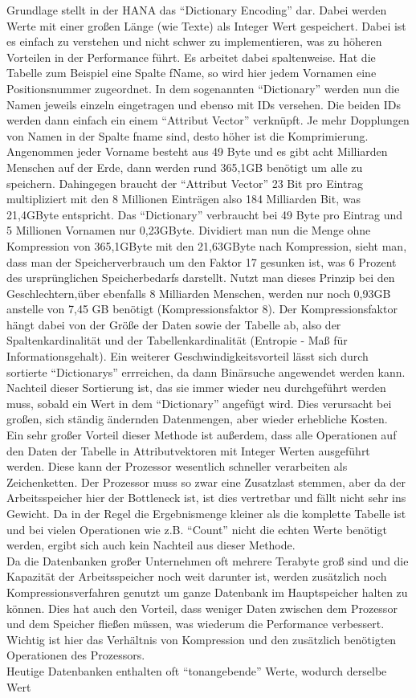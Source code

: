 \documentclass[a4paper, 12pt]{scrartcl}
\begin{document}
Grundlage stellt in der HANA das "`Dictionary Encoding"' dar. Dabei werden Werte mit einer großen Länge (wie Texte) als Integer Wert gespeichert. Dabei ist es einfach zu verstehen und nicht schwer zu implementieren, was zu höheren Vorteilen in der Performance führt. Es arbeitet dabei spaltenweise. Hat die Tabelle zum Beispiel eine Spalte fName, so wird hier jedem Vornamen eine Positionsnummer zugeordnet. In dem sogenannten "`Dictionary"' werden nun die Namen jeweils einzeln eingetragen und ebenso mit IDs versehen. Die beiden IDs werden dann einfach ein einem "`Attribut Vector"' verknüpft. Je mehr Dopplungen von Namen in der Spalte fname sind, desto höher ist die Komprimierung. Angenommen jeder Vorname besteht aus 49 Byte und es gibt acht Milliarden Menschen auf der Erde, dann werden rund 365,1GB benötigt um alle zu speichern. Dahingegen braucht der "`Attribut Vector"' 23 Bit pro Eintrag multipliziert mit den 8 Millionen Einträgen also 184 Milliarden Bit, was 21,4GByte entspricht. Das "`Dictionary"' verbraucht bei 49 Byte pro Eintrag  und 5 Millionen Vornamen nur 0,23GByte. Dividiert man nun die Menge ohne Kompression von 365,1GByte mit den 21,63GByte nach Kompression, sieht man, dass man der Speicherverbrauch um den Faktor 17 gesunken ist, was 6 Prozent des ursprünglichen Speicherbedarfs darstellt. Nutzt man dieses Prinzip bei den Geschlechtern,über ebenfalls 8 Milliarden Menschen, werden nur noch 0,93GB anstelle von 7,45 GB benötigt (Kompressionsfaktor 8). Der Kompressionsfaktor hängt dabei von der Größe der Daten sowie der Tabelle ab, also der Spaltenkardinalität und der Tabellenkardinalität (Entropie - Maß für Informationsgehalt). Ein weiterer Geschwindigkeitsvorteil lässt sich durch sortierte "`Dictionarys"' errreichen, da dann Binärsuche angewendet werden kann. Nachteil dieser Sortierung ist, das sie immer wieder neu durchgeführt werden muss, sobald ein Wert in dem "`Dictionary"' angefügt wird. Dies verursacht bei großen, sich ständig ändernden Datenmengen, aber wieder erhebliche Kosten. \\ Ein sehr großer Vorteil dieser Methode ist außerdem, dass alle Operationen auf den Daten der Tabelle in Attributvektoren mit Integer Werten ausgeführt werden. Diese kann der Prozessor wesentlich schneller verarbeiten als Zeichenketten. Der Prozessor muss so zwar eine Zusatzlast stemmen, aber da der Arbeitsspeicher hier der Bottleneck ist, ist dies vertretbar und fällt nicht sehr ins Gewicht. Da in der Regel die Ergebnismenge kleiner als die komplette Tabelle ist und bei vielen Operationen wie z.B. "`Count"' nicht die echten Werte benötigt werden, ergibt sich auch kein Nachteil aus dieser Methode. \\ Da die Datenbanken großer Unternehmen oft mehrere Terabyte groß sind und die Kapazität der Arbeitsspeicher noch weit darunter ist, werden zusätzlich noch Kompressionsverfahren genutzt um ganze Datenbank im Hauptspeicher halten zu können. Dies hat auch den Vorteil, dass weniger Daten zwischen dem Prozessor und dem Speicher fließen müssen, was wiederum die Performance verbessert. Wichtig ist hier das Verhältnis von Kompression und den zusätzlich benötigten Operationen des Prozessors. \\ Heutige Datenbanken enthalten oft "`tonangebende"' Werte, wodurch derselbe Wert 
\end{document}
